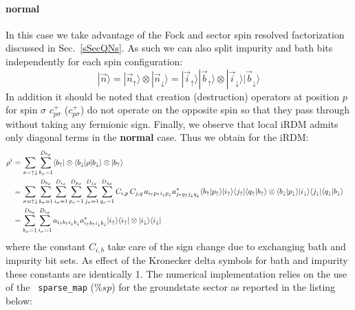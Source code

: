 \documentclass[preprint,3p,10pt]{elsarticle}
\newcommand{\secu}[1]
{Sec.~\ref{#1}}
\newcommand{\ket}[1]
{|#1\rangle}
\newcommand{\bra}[1]
{\langle #1|}
\def\up{\uparrow} \def\down{\downarrow} \def\dw{\downarrow}
\begin{document}
\paragraph{{\bf normal}}
In this case we take advantage of the Fock and sector spin resolved
factorization discussed in \secu{sSecQNs}. As such we can also split
impurity and bath bits independently for each spin configuration:
$$
\ket{\vec{n}} =
\ket{\vec{n}_\up}\otimes \ket{\vec{n}_\dw} =
\ket{\vec{i}_\up}\ket{\vec{b}_\up}\otimes \ket{\vec{i}_\dw}\ket{\vec{b}_\dw}
$$
In addition it should be noted that creation (destruction) operators at
position $p$ for spin $\sigma$  $c^+_{p\sigma}$ ($c^+_{p\sigma}$) do
not operate on the opposite spin so that they pass through without
taking any fermionic sign. Finally, we observe that local iRDM admits
only diagonal terms in the {\bf normal} case. Thus we obtain for the iRDM:
\begin{equation}
  \label{iRDMnormal}
  \begin{aligned}
  \rho^i &=
  \sum_{\sigma=\up\dw}\sum_{b_\sigma=1}^{D_{b_\sigma}}
  \bra{b_\up}\otimes\bra{b_\dw}
    \rho
    \ket{b_\dw}\otimes\ket{b_\up}    \cr
    &=\sum_{\sigma=\up\dw}
    \sum_{b_\sigma=1}^{D_{b_\sigma}}
    \sum_{i_\sigma=1}^{D_{i_\sigma}}
    \sum_{p_\sigma=1}^{D_{p_\sigma}}
    \sum_{j_\sigma=1}^{D_{j_\sigma}} 
    \sum_{q_\sigma=1}^{D_{q_\sigma}}
    C_{i,p}\,C_{j,q}\,a_{i_\up p_\up i_\dw p_\dw} a^*_{j_\up q_\up j_\dw q_\dw}
    \langle b_\up| p_\up\rangle| i_\up\rangle\langle j_\up |\langle q_\up| b_\up\rangle   \otimes \langle b_\dw| p_\dw \rangle|i_\dw\rangle \langle j_\dw  |\langle q_\dw| b_\dw\rangle
    \cr
&=
    \sum_{b_\sigma=1}^{D_{b_\sigma}}
    \sum_{i_\sigma=1}^{D_{i_\sigma}}
    a_{i_\up b_\up i_\dw b_\dw} a^*_{i_\up b_\up i_\dw b_\dw}
    \ket{i_\up}\bra{i_\up}\otimes \ket{i_\dw}\bra{i_\dw}
  \end{aligned}
\end{equation}
where the constant $C_{i,b}$ take care of the sign change due to
exchanging bath and impurity bit sets. As effect of the Kronecker
delta symbols for bath and impurity these constants are identically 1.  
The numerical implementation relies on the use of the {\tt
  sparse\_map} ($\%sp$) for the groundstate sector as reported in the
listing below:  
\end{document}
